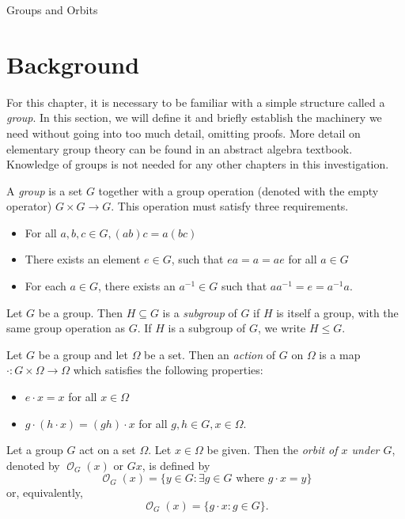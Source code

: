 \documentclass[12pt]{pom_thesis}
\DeclareMathOperator{\orb}{\mathcal{O}}
\begin{document}
\begin{chapter}{Groups and Orbits} \label{chap_groups}
\section{Background}
For this chapter, it is necessary to be familiar with a simple structure called a \emph{group}. In this section, we will define it and briefly establish the machinery we need without going into too much detail, omitting proofs. More detail on elementary group theory can be found in an abstract algebra textbook. Knowledge of groups is not needed for any other chapters in this investigation.

\begin{defn}
A \emph{group} is a set $G$ together with a group operation (denoted with the empty operator) $G \times G \rightarrow G$. This operation must satisfy three requirements.
\begin{itemize}
\item For all $a,b,c \in G, (ab)c = a(bc)$
\item There exists an element $e \in G$, such that $ea=a=ae$ for all $a \in G$
\item For each $a \in G$, there exists an $a^{-1} \in G$ such that $aa^{-1} = e = a^{-1}a$.
\end{itemize} 
\end{defn}
\begin{defn}
Let $G$ be a group. Then $H \subseteq G$ is a \emph{subgroup} of $G$ if $H$ is itself a group, with the same group operation as $G$. If $H$ is a subgroup of $G$, we write $H \leq G$.
\end{defn}
\begin{defn}
Let $G$ be a group and let $\Omega$ be a set. Then an \emph{action} of $G$ on $\Omega$ is a map $\cdot:G \times \Omega \rightarrow \Omega$ which satisfies the following properties:
\begin{itemize}
\item $e \cdot x = x$ for all $x \in \Omega$
\item $g \cdot (h \cdot x) = (gh) \cdot x$ for all $g,h \in G, x \in \Omega$.
\end{itemize} 
\end{defn}
\begin{defn}
Let a group $G$ act on a set $\Omega$. Let $x \in \Omega$ be given. Then the \emph{orbit of $x$ under $G$}, denoted by $\orb_G(x)$ or $Gx$, is defined by
\[
\orb_G(x) = \{ y \in G : \exists g \in G \text{ where } g\cdot x = y\}
\]
or, equivalently,
\[
\orb_G(x) = \{g\cdot x : g \in G\}.
\]
\end{defn}


\end{chapter}
\end{document}
